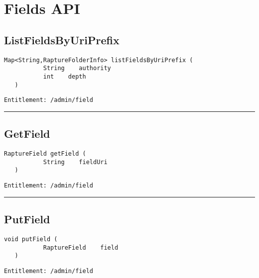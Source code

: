 \chapter{Fields API}

\section{ListFieldsByUriPrefix}
\label{Api:ListFieldsByUriPrefix}
\begin{lstlisting}[style=nonumbers]
   Map<String,RaptureFolderInfo> listFieldsByUriPrefix (
           String    authority
           int    depth
   )
\end{lstlisting}
\begin{Verbatim}[formatcom=\color{Maroon}]
  Entitlement: /admin/field
\end{Verbatim}



\rule{12cm}{2pt}
\section{GetField}
\label{Api:GetField}
\begin{lstlisting}[style=nonumbers]
   RaptureField getField (
           String    fieldUri
   )
\end{lstlisting}
\begin{Verbatim}[formatcom=\color{Maroon}]
  Entitlement: /admin/field
\end{Verbatim}



\rule{12cm}{2pt}
\section{PutField}
\label{Api:PutField}
\begin{lstlisting}[style=nonumbers]
   void putField (
           RaptureField    field
   )
\end{lstlisting}
\begin{Verbatim}[formatcom=\color{Maroon}]
  Entitlement: /admin/field
\end{Verbatim}



